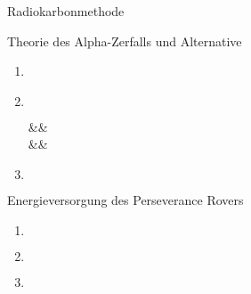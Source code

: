 \documentclass{alex_hü}
\begin{document}
\renewcommand{\labelenumi}{\alph{enumi})}


\begin{mybox}{Radiokarbonmethode}
	
\end{mybox}

\begin{mybox}{Theorie des Alpha-Zerfalls und Alternative}
	\centering \(  \)
	\tcblower
	\begin{enumerate}
		\item 
	\tcbline
		\item \(  \)
		\begin{flalign*}
			 &&\\
			 &&
		\end{flalign*}
	\tcbline
		\item \(  \)
	\end{enumerate}
\end{mybox}

\begin{mybox}{Energieversorgung des Perseverance Rovers}
	\centering \(  \)
	\tcblower
	\begin{enumerate}
		\item \(  \)
	\tcbline
		\item \(  \)
	\tcbline
		\item \(  \)
	\end{enumerate}
\end{mybox}
\end{document}
